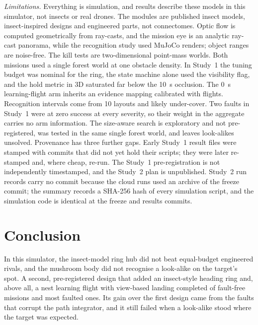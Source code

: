 \documentclass[10pt,twocolumn]{article}
\begin{document}
\emph{Limitations.} Everything is simulation, and results describe these models in this simulator, not insects or real drones. The modules are published insect models, insect-inspired designs and engineered parts, not connectomes. Optic flow is computed geometrically from ray-casts, and the mission eye is an analytic ray-cast panorama, while the recognition study used MuJoCo renders; object ranges are noise-free. The kill tests are two-dimensional point-mass worlds. Both missions used a single forest world at one obstacle density. In Study~1 the tuning budget was nominal for the ring, the state machine alone used the visibility flag, and the hold metric in 3D saturated far below the 10~s occlusion. The 0~s learning-flight arm inherits an evidence mapping calibrated with flights. Recognition intervals come from 10 layouts and likely under-cover. Two faults in Study~1 were at zero success at every severity, so their weight in the aggregate carries no arm information. The size-aware search is exploratory and not pre-registered, was tested in the same single forest world, and leaves look-alikes unsolved. Provenance has three further gaps. Early Study~1 result files were stamped with commits that did not yet hold their scripts; they were later re-stamped and, where cheap, re-run. The Study~1 pre-registration is not independently timestamped, and the Study~2 plan is unpublished. Study~2 run records carry no commit because the cloud runs used an archive of the freeze commit; the summary records a SHA-256 hash of every simulation script, and the simulation code is identical at the freeze and results commits.

\section{Conclusion}
In this simulator, the insect-model ring hub did not beat equal-budget engineered rivals, and the mushroom body did not recognise a look-alike on the target's spot. A second, pre-registered design that added an insect-style heading ring and, above all, a nest learning flight with view-based landing completed \StwoNoFault{} of fault-free missions and most faulted ones. Its gain over the first design came from the faults that corrupt the path integrator, and it still failed when a look-alike stood where the target was expected.

\clearpage
\end{document}
